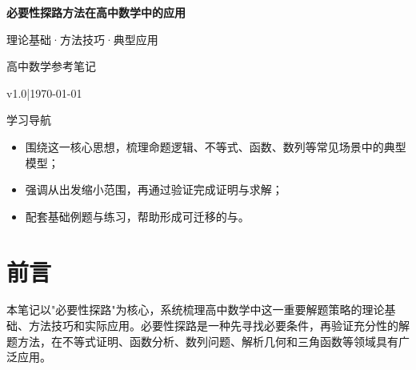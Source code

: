 \documentclass[a4paper,11pt]{ctexart}
\theoremstyle{definition}
\theoremstyle{remark}
\renewcommand{\notetitle}{必要性探路方法在高中数学中的应用}
\renewcommand{\noteauthor}{高中数学参考笔记}
\renewcommand{\notedate}{\today}
\renewcommand{\notesubtitle}{理论基础·方法技巧·典型应用}
\renewcommand{\noteversion}{v1.0}
\begin{document}
\thispagestyle{empty}
\setcounter{page}{1}

\noindent
\begin{minipage}[t][0.7\textheight][c]{\textwidth}
  \raggedleft
  \vspace*{\fill}
  {\sffamily\bfseries\Huge\color{accent}\notetitle\par}
  \vspace{0.6em}
  {\Large\color{inkgray}\notesubtitle\par}
  \vspace{0.5em}
  {\large\color{inkgray}\noteauthor\par}
  \vspace{0.4em}
  {\normalsize\color{inkgray}\noteversion\quad|\quad\notedate\par}
  \vspace*{\fill}
\end{minipage}

\begin{center}
\begin{minipage}{0.84\textwidth}
  \textcolor{inkgray}{\sffamily\small 学习导航}\\
  \begin{itemize}
    \item 围绕这一核心思想，梳理命题逻辑、不等式、函数、数列等常见场景中的典型模型；
    \item 强调从出发缩小范围，再通过验证完成证明与求解；
    \item 配套基础例题与练习，帮助形成可迁移的与。
  \end{itemize}
\end{minipage}
\end{center}
\vspace{1em}

\clearpage
\thispagestyle{plain}

\tableofcontents
\newpage

\section*{前言}

本笔记以"必要性探路"为核心，系统梳理高中数学中这一重要解题策略的理论基础、方法技巧和实际应用。必要性探路是一种先寻找必要条件，再验证充分性的解题方法，在不等式证明、函数分析、数列问题、解析几何和三角函数等领域具有广泛应用。
\end{document}
